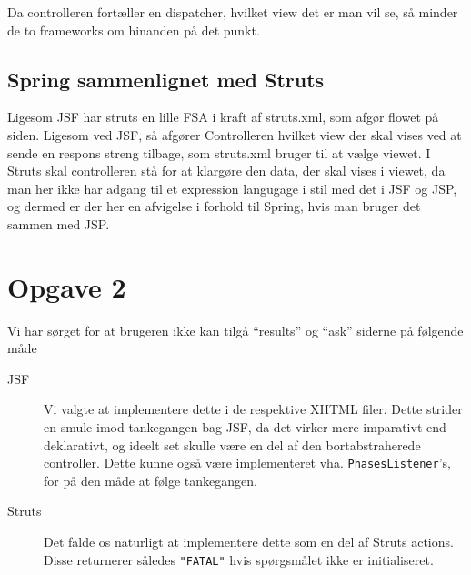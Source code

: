 \documentclass[a4paper,10pt]{article}
\begin{document}
Da controlleren fortæller en dispatcher, hvilket view det er man vil se, så minder de to frameworks om hinanden på det punkt.

\subsection*{Spring sammenlignet med Struts}
Ligesom JSF har struts en lille FSA i kraft af struts.xml, som afgør flowet på siden. Ligesom ved JSF, så afgører Controlleren hvilket view der skal vises ved at sende en respons streng tilbage, som struts.xml bruger til at vælge viewet. I Struts skal controlleren stå for at klargøre den data, der skal vises i viewet, da man her ikke har adgang til et expression langugage i stil med det i JSF og JSP, og dermed er der her en afvigelse i forhold til Spring, hvis man bruger det sammen med JSP.


\section*{Opgave 2}

Vi har sørget for at brugeren ikke kan tilgå ``results'' og ``ask'' siderne på følgende måde
\begin{description}
\item[JSF] Vi valgte at implementere dette i de respektive XHTML filer. Dette strider en smule imod tankegangen bag JSF, da det virker mere imparativt end deklarativt, og ideelt set skulle være en del af den bortabstraherede controller. Dette kunne også være implementeret vha. \texttt{PhasesListener}'s, for på den måde at følge tankegangen. 
\item[Struts] Det falde os naturligt at implementere dette som en del af Struts actions. Disse returnerer således \texttt{"FATAL"} hvis spørgsmålet ikke er initialiseret. 
\end{description}
\end{document}
